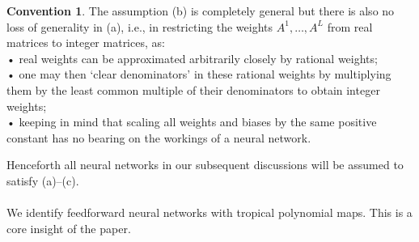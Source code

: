 \documentclass{article}
\theoremstyle{definition}
\newtheorem{convention}[theorem]{Convention}
\begin{document}
\begin{convention}\hspace{1sp}\cite{zhang2018tropical}
The assumption (b) is completely general but there is also no loss of generality in (a), i.e., in restricting the weights $A^{1}, \dots ,A^{L}$
from real matrices to integer matrices, as: \\
• real weights can be approximated arbitrarily closely by
rational weights; \\
• one may then ‘clear denominators’ in these rational
weights by multiplying them by the least common multiple of their denominators to obtain integer weights; \\
• keeping in mind that scaling all weights and biases
by the same positive constant has no bearing on the
workings of a neural network.
\end{convention}

Henceforth all neural networks in our subsequent discussions will be assumed to satisfy (a)–(c). \\ \\

We identify feedforward neural networks with tropical polynomial maps. This is a core insight of the paper.
\end{document}
